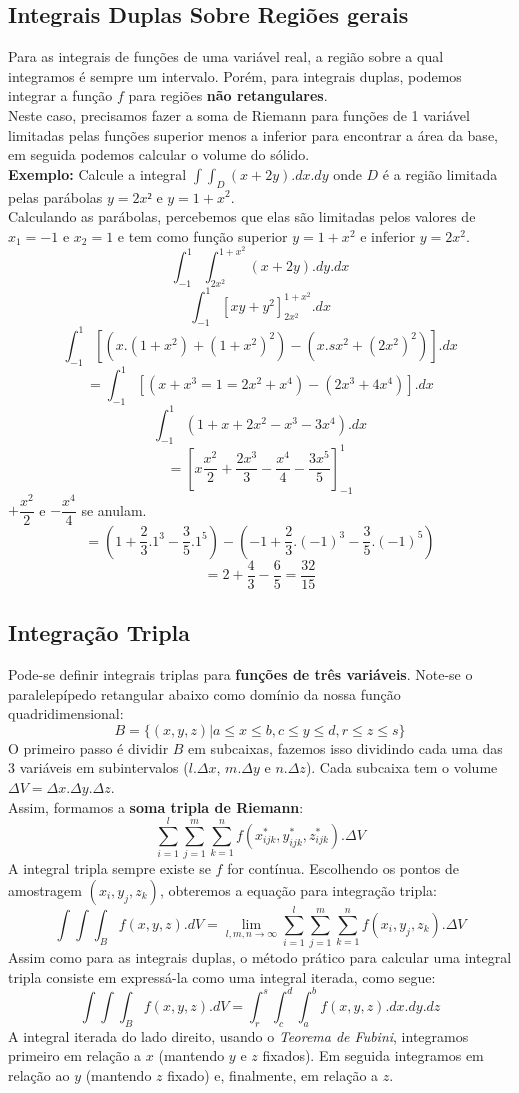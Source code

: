 \documentclass{article}
\begin{document}
		\subsection{Integrais Duplas Sobre Regiões gerais}
			Para as integrais de funções de uma variável real, a região sobre a qual integramos é sempre um intervalo. Porém, para integrais duplas, podemos integrar a função $f$ para regiões \textbf{não retangulares}.\\
			Neste caso, precisamos fazer a soma de Riemann para funções de 1 variável limitadas pelas funções superior menos a inferior para encontrar a área da base, em seguida podemos calcular o volume do sólido.\\
			\textbf{Exemplo:} Calcule a integral $\int \int_D (x+2y).dx.dy$ onde $D$ é a região limitada pelas parábolas $y=2x²$ e $y =1+x^2$.\\
			Calculando as parábolas, percebemos que elas são limitadas pelos valores de $x_1=-1$ e $x_2=1$ e tem como função superior $y=1+x^2$ e inferior $y=2x^2$.
			$$\int_{-1}^1 \int_{2x^2}^{1+x^2}(x+2y).dy.dx$$
			$$\int_{-1}^1[xy+y^2]_{2x^2}^{1+x^2}.dx$$
			$$\int_{-1}^1 [(x.(1+x^2)+(1+x^2)^2)-(x.sx^2+(2x^2)^2)].dx$$
			$$=\int_{-1}^1[(x+x^3=1=2x^2+x^4)-(2x^3+4x^4)].dx$$
			$$\int_{-1}^1(1+x+2x^2-x^3-3x^4).dx$$
			$$=[x\dfrac{x^2}{2}+\dfrac{2x^3}{3}-\dfrac{x^4}{4}-\dfrac{3x^5}{5}]_{-1}^1$$
			$+\dfrac{x^2}{2}$ e $-\dfrac{x^4}{4}$ se anulam.
			$$=(1+\dfrac{2}{3}.1^3-\dfrac{3}{5}.1^5)-(-1+\dfrac{2}{3}.(-1)^3-\dfrac{3}{5}.(-1)^5)$$
			$$=2+\dfrac{4}{3}-\dfrac{6}{5}=\dfrac{32}{15}$$
		\subsection{Integração Tripla}
			Pode-se definir integrais triplas para \textbf{funções de três variáveis}. Note-se o paralelepípedo retangular abaixo como domínio da nossa função quadridimensional:
			$$B=\{(x,y,z)|a\leq x \leq b,c \leq y \leq d, r \leq z \leq s\}$$
			O primeiro passo é dividir $B$ em subcaixas, fazemos isso dividindo cada uma das 3 variáveis em subintervalos ($l.\Delta x$, $m.\Delta y$ e $n.\Delta z$). Cada subcaixa tem o volume $\Delta V = \Delta x.\Delta y .\Delta z$.\\
			Assim, formamos a  \textbf{soma tripla de Riemann}:
			$$\sum_{i=1}^l \sum_{j=1}^m \sum_{k=1}^n f(x_{ijk}^*,y_{ijk}^*,z_{ijk}^*).\Delta V$$
			A integral tripla sempre existe se $f$ for contínua. Escolhendo os pontos de amostragem $(x_i,y_j,z_k)$, obteremos a equação para integração tripla:
			$$\int \int \int _B f(x,y,z).dV = \lim_{l,m,n \to \infty} \sum_{i=1}^l \sum_{j=1}^m \sum_{k=1}^n f(x_i,y_j,z_k).\Delta V$$
			Assim como para as integrais duplas, o método prático para calcular uma integral tripla consiste em expressá-la como uma integral iterada, como segue:
			$$\int \int \int _B f(x,y,z).dV = \int_r^s \int_c^d \int_a^b f(x,y,z).dx.dy.dz$$
			A integral iterada do lado direito, usando o \textit{Teorema de Fubini}, integramos primeiro em relação a $x$ (mantendo $y$ e $z$ fixados). Em seguida integramos em relação ao $y$ (mantendo $z$ fixado) e, finalmente, em relação a $z$.
 
\end{document}
